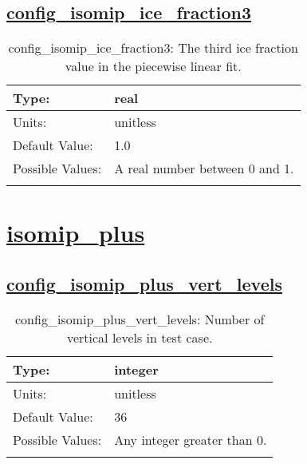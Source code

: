 \subsection[config\_isomip\_ice\_fraction3]{\hyperref[sec:nm_tab_isomip]{config\_isomip\_ice\_fraction3}}
\label{subsec:nm_sec_config_isomip_ice_fraction3}
\begin{center}
\begin{longtable}{| p{2.0in} || p{4.0in} |}
    \hline
    Type: & real \\
    \hline
    Units: & \si{unitless} \\
    \hline
    Default Value: & 1.0 \\
    \hline
    Possible Values: & A real number between 0 and 1. \\
    \hline
    \caption{config\_isomip\_ice\_fraction3: The third ice fraction value in the piecewise linear fit.}
\end{longtable}
\end{center}
\section[isomip\_plus]{\hyperref[sec:nm_tab_isomip_plus]{isomip\_plus}}
\label{sec:nm_sec_isomip_plus}
\subsection[config\_isomip\_plus\_vert\_levels]{\hyperref[sec:nm_tab_isomip_plus]{config\_isomip\_plus\_vert\_levels}}
\label{subsec:nm_sec_config_isomip_plus_vert_levels}
\begin{center}
\begin{longtable}{| p{2.0in} || p{4.0in} |}
    \hline
    Type: & integer \\
    \hline
    Units: & \si{unitless} \\
    \hline
    Default Value: & 36 \\
    \hline
    Possible Values: & Any integer greater than 0. \\
    \hline
    \caption{config\_isomip\_plus\_vert\_levels: Number of vertical levels in test case.}
\end{longtable}
\end{center}
